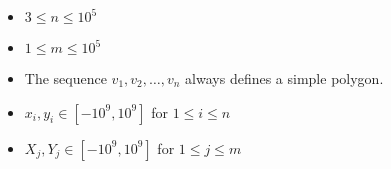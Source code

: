 \begin{itemize}
\tightlist
\item $3\le n\le 10^5$
\item $1\le m\le 10^5$
\item The sequence $v_1,v_2,\dots,v_n$ always defines a simple polygon.
\item $x_i,y_i\in[-10^9,10^9]$ for $1\le i\le n$
\item $X_j,Y_j\in[-10^9,10^9]$ for $1\le j\le m$
\end{itemize}
